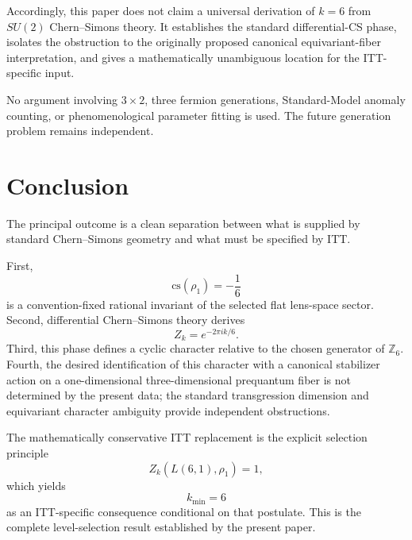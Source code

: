 \documentclass[11pt,a4paper]{article}
\begin{document}
Accordingly, this paper does not claim a universal derivation of $k=6$ from $SU(2)$ Chern--Simons theory. It establishes the standard differential-CS phase, isolates the obstruction to the originally proposed canonical equivariant-fiber interpretation, and gives a mathematically unambiguous location for the ITT-specific input.

No argument involving $3\times2$, three fermion generations, Standard-Model anomaly counting, or phenomenological parameter fitting is used. The future generation problem remains independent.

\section{Conclusion}

The principal outcome is a clean separation between what is supplied by standard Chern--Simons geometry and what must be specified by ITT.

First,
\begin{equation}
\mathrm{cs}(\rho_1)=-\frac16
\end{equation}
is a convention-fixed rational invariant of the selected flat lens-space sector. Second, differential Chern--Simons theory derives
\begin{equation}
Z_k=e^{-2\pi i k/6}.
\end{equation}
Third, this phase defines a cyclic character relative to the chosen generator of $\mathbb Z_6$. Fourth, the desired identification of this character with a canonical stabilizer action on a one-dimensional three-dimensional prequantum fiber is not determined by the present data; the standard transgression dimension and equivariant character ambiguity provide independent obstructions.

The mathematically conservative ITT replacement is the explicit selection principle
\begin{equation}
Z_k(L(6,1),\rho_1)=1,
\end{equation}
which yields
\begin{equation}
\boxed{k_{\min}=6}
\end{equation}
as an ITT-specific consequence conditional on that postulate. This is the complete level-selection result established by the present paper.
\end{document}
